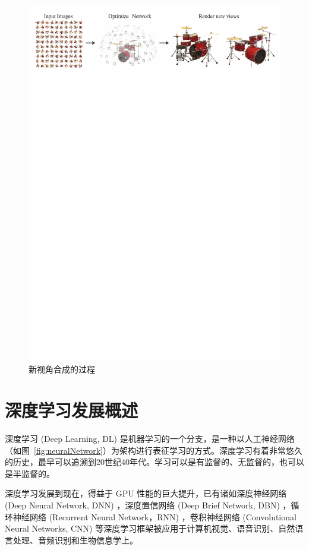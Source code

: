 \begin{figure}[t]
  \centering
  \includegraphics[width=0.95\linewidth]{figures/drums.pdf}
  \caption{新视角合成的过程\cite{mildenhall2020nerf}}
  \label{fig:novelviewsynthesis}
\end{figure}

\section{深度学习发展概述}
深度学习 (Deep Learning, DL) 是机器学习的一个分支，是一种以人工神经网络（如图~\ref{fig:neuralNetwork}）为架构进行表征学习的方式。深度学习有着非常悠久的历史，最早可以追溯到20世纪40年代\cite{goodfellow2016deep}。学习可以是有监督的、无监督的，也可以是半监督的。

深度学习发展到现在，得益于 GPU 性能的巨大提升，已有诸如深度神经网络 (Deep Neural Network, DNN) ，深度置信网络\cite{hinton2009deep} (Deep Brief Network, DBN) ，循环神经网络\cite{rumelhart1986learning} (Recurrent Neural Network，RNN) ，卷积神经网络\cite{lecun1995convolutional} (Convolutional Neural Networks, CNN) 等深度学习框架被应用于计算机视觉、语音识别、自然语言处理、音频识别和生物信息学上。

